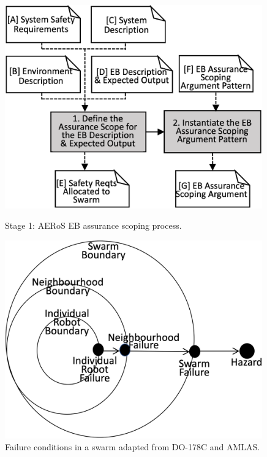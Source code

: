 \documentclass[runningheads]{llncs}
\begin{document}
\begin{figure}[!t]
	\centering
	\begin{minipage}{.5\textwidth}
		\centering
		\includegraphics[width=0.99\textwidth]{figures/AMLAS-STAGE-1-V4.png}
		\vspace{-2ex}
		\caption{Stage 1: AERoS EB assurance scoping process.}
		\label{amlas-a-stage1}
	\end{minipage}%
	\begin{minipage}{.5\textwidth}
		\centering
		\includegraphics[width=0.99\textwidth]{figures/stage1-failureevents-v3.png}
		\vspace{-2ex}
		\caption{Failure conditions in a swarm adapted from DO-178C and AMLAS.}
		\label{failure-events}
	\end{minipage}
	\vspace{-4ex}
\end{figure}
\end{document}
